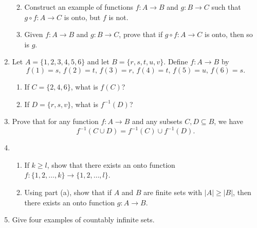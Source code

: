 \documentclass[12pt]{article}
\newcommand{\points}[1]{\marginpar{\hspace{24pt}[#1]}}
\begin{document}
\begin{enumerate}
\begin{enumerate}
\vspace{2.5in}

\item Construct an example of functions $f:A\to B$ and $g:B\to C$ such that $g\circ f:A\to C$ is onto, but $f$ is not. \points{2}

\vspace{2.5in}

\item Given $f:A\to B$ and $g:B\to C$, prove that if $g\circ f:A\to C$ is onto, then so is $g$. \points{4}
      \end{enumerate}
\newpage

\item Let $A = \{1,2,3,4,5,6\}$ and let $B = \{r,s,t,u,v\}$. Define $f:A\to B$ by
\[
 f(1) = s,\, f(2) = t,\, f(3) = r,\, f(4) = t,\, f(5) = u,\, f(6) = s.
\]
\begin{enumerate}
 \item If $C = \{2,4,6\}$, what is $f(C)$? \points{2}

\vspace{1.5in}

 \item If $D = \{r,s,v\}$, what is $f^{-1}(D)$? \points{2}

\vspace{1.5in}


\end{enumerate}
\item Prove that for any function $f:A\to B$ and any subsets $C,D\subseteq B$, we have \points{5}
\[
 f^{-1}(C\cup D) = f^{-1}(C)\cup f^{-1}(D).
\]


\newpage

\item \begin{enumerate}
       \item If $k\geq l$, show that there exists an onto function $f:\{1,2,\ldots, k\}\to\{1,2,\ldots, l\}$. \points{4}

\vspace{2.5in}

       \item Using part (a), show that if $A$ and $B$ are finite sets with $|A|\geq |B|$, then there exists an onto function $g:A\to B$. \points{4}
      \end{enumerate}

\vspace{2.5in}

\item Give four examples of countably infinite sets. \points{4}


\end{enumerate}
\end{document}

